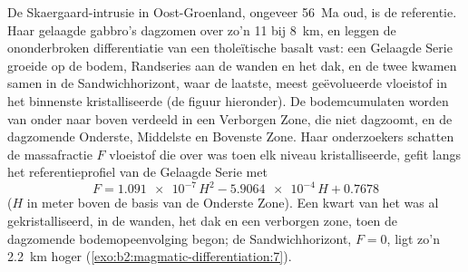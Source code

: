De Skaergaard-intrusie in Oost-Groenland, ongeveer \qty{56}{Ma} oud, is de
referentie. Haar gelaagde gabbro's dagzomen over zo'n 11 bij \qty{8}{km}, en leggen de
ononderbroken differentiatie van een tholeïtische basalt vast: een Gelaagde Serie groeide op de
bodem, Randseries aan de wanden en het dak, en de twee kwamen samen in de Sandwichhorizont,
waar de laatste, meest geëvolueerde vloeistof in het binnenste kristalliseerde (de figuur hieronder).
De bodemcumulaten worden van onder naar boven verdeeld in een Verborgen Zone, die niet dagzoomt,
en de dagzomende Onderste, Middelste en Bovenste Zone. Haar
onderzoekers schatten de massafractie $F$ vloeistof die over was toen elk niveau kristalliseerde, gefit
langs het referentieprofiel van de Gelaagde Serie met
\[
F = \num{1.091e-7}\,H^2 - \num{5.9064e-4}\,H + 0.7678
\]
($H$ in meter boven de basis van de Onderste Zone). Een kwart van het  was al
gekristalliseerd, in de wanden, het dak en een verborgen zone, toen de dagzomende
bodemopeenvolging begon; de Sandwichhorizont, $F = 0$, ligt zo'n \qty{2.2}{km} hoger
(\cref{exo:b2:magmatic-differentiation:7}).


